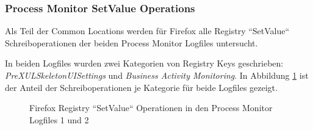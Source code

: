 \begin{appendices}
		\subsubsection*{Process Monitor SetValue Operations}
		\label{subsubsection:appendix-firefox-registry-processmonitorsetvalue}
		Als Teil der Common Locations werden für Firefox alle Registry ``SetValue`` Schreiboperationen der beiden Process Monitor Logfiles untersucht.
		
		In beiden Logfiles wurden zwei Kategorien von Registry Keys geschrieben: \textit{PreXULSkeletonUISettings} und \textit{Business Activity Monitoring}. In Abbildung \ref{chart:firefox-registy-css-vs-bam} ist der Anteil der Schreiboperationen je Kategorie für beide Logfiles gezeigt.
		\begin{figure}[h!]
			\caption{Firefox Registry ``SetValue`` Operationen in den Process Monitor Logfiles 1 und 2}
			\label{chart:firefox-registy-css-vs-bam}
		\end{figure}
		
		

\end{appendices}
